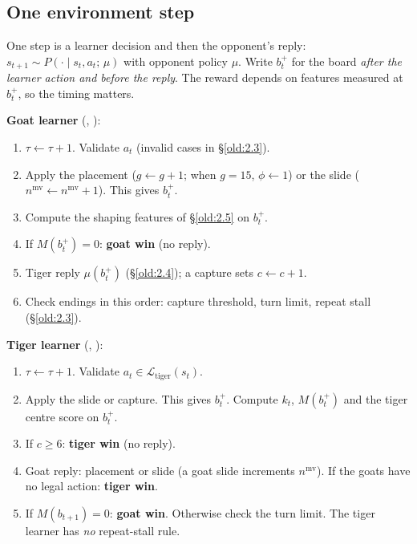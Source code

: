 \subsection{One environment step}\label{old:2.2}

One step is a learner decision and then the opponent's reply: $s_{t+1} \sim P(\cdot \mid s_t, a_t;\, \mu)$ with opponent policy $\mu$. Write $b^{+}_t$ for the board \emph{after the learner action and before the reply}. The reward depends on features measured at $b^{+}_t$, so the timing matters.

\textbf{Goat learner} (, ):

\begin{enumerate}
\item $\tau \leftarrow \tau + 1$. Validate $a_t$ (invalid cases in \S\ref{old:2.3}).
\item Apply the placement ($g \leftarrow g+1$; when $g = 15$, $\phi \leftarrow 1$) or the slide ($n^{\text{mv}} \leftarrow n^{\text{mv}} + 1$). This gives $b^+_t$.
\item Compute the shaping features of \S\ref{old:2.5} on $b^+_t$.
\item If $M(b^+_t) = 0$: \textbf{goat win} (no reply).
\item Tiger reply $\mu(b^+_t)$ (\S\ref{old:2.4}); a capture sets $c \leftarrow c + 1$.
\item Check endings in this order: capture threshold, turn limit, repeat stall (\S\ref{old:2.3}).
\end{enumerate}
\textbf{Tiger learner} (, ):

\begin{enumerate}
\item $\tau \leftarrow \tau + 1$. Validate $a_t \in \mathcal{L}_{\text{tiger}}(s_t)$.
\item Apply the slide or capture. This gives $b^+_t$. Compute $k_t$, $M(b^+_t)$ and the tiger centre score on $b^+_t$.
\item If $c \geq 6$: \textbf{tiger win} (no reply).
\item Goat reply: placement or slide (a goat slide increments $n^{\text{mv}}$). If the goats have no legal action: \textbf{tiger win}.
\item If $M(b_{t+1}) = 0$: \textbf{goat win}. Otherwise check the turn limit. The tiger learner has \emph{no} repeat-stall rule.
\end{enumerate}
